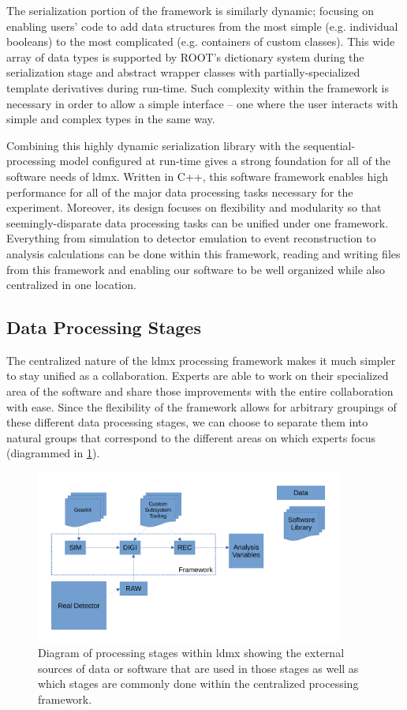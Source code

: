 The serialization portion of the framework is similarly dynamic; focusing on enabling users' code
to add data structures from the most simple (e.g. individual booleans) to the most complicated
(e.g. containers of custom classes). This wide array of data types is supported by ROOT's
dictionary system during the serialization stage and abstract wrapper classes with
partially-specialized template derivatives during run-time. Such complexity within the framework is
necessary in order to allow a simple interface -- one where the user interacts with simple and
complex types in the same way.

Combining this highly dynamic serialization library with the sequential-processing model configured
at run-time gives a strong foundation for all of the software needs of \ac{ldmx}. Written in C++,
this software framework enables high performance for all of the major data processing tasks
necessary for the experiment. Moreover, its design focuses on flexibility and modularity so that
seemingly-disparate data processing tasks can be unified under one framework. Everything from
simulation to detector emulation to event reconstruction to analysis calculations can be done
within this framework, reading and writing files from this framework and enabling our software to
be well organized while also centralized in one location.

\subsection{Data Processing Stages}
The centralized nature of the \ac{ldmx} processing framework makes it much simpler to stay unified
as a collaboration. Experts are able to work on their specialized area of the software and
share those improvements with the entire collaboration with ease. Since the flexibility of the
framework allows for arbitrary groupings of these different data processing stages, we can choose
to separate them into natural groups that correspond to the different areas on which experts focus
(diagrammed in \cref{fig:ldmx:sim:data-stages}).

\begin{figure}
  \centering
  \includegraphics[width=0.9\textwidth]{figures/ldmx/simulation/data-flow.pdf}
  \caption{Diagram of processing stages within \ac{ldmx} showing the external sources of data or software that are used in those stages as well as which stages are commonly done within the centralized processing framework.}
  \label{fig:ldmx:sim:data-stages}
\end{figure}

